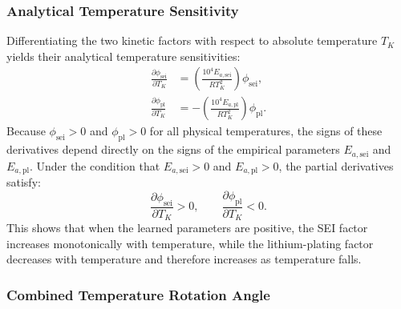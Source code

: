 \documentclass[a4paper,fleqn]{cas-sc}
\begin{document}
\subsubsection{Analytical Temperature Sensitivity}

Differentiating the two kinetic factors with respect to absolute temperature $T_K$ yields their analytical temperature sensitivities:
\begin{align}
\frac{\partial \phi_{\mathrm{sei}}}{\partial T_K} &= \left(\frac{10^4 E_{a,\mathrm{sei}}}{R T_K^2}\right)\phi_{\mathrm{sei}}, \label{eq:dphi_sei} \\
\frac{\partial \phi_{\mathrm{pl}}}{\partial T_K} &= -\left(\frac{10^4 E_{a,\mathrm{pl}}}{R T_K^2}\right)\phi_{\mathrm{pl}}. \label{eq:dphi_pl}
\end{align}
Because $\phi_{\mathrm{sei}} > 0$ and $\phi_{\mathrm{pl}} > 0$ for all physical temperatures, the signs of these derivatives depend directly on the signs of the empirical parameters $E_{a,\mathrm{sei}}$ and $E_{a,\mathrm{pl}}$. Under the condition that $E_{a,\mathrm{sei}} > 0$ and $E_{a,\mathrm{pl}} > 0$, the partial derivatives satisfy:
\begin{equation}
\frac{\partial \phi_{\mathrm{sei}}}{\partial T_K} > 0, \qquad \frac{\partial \phi_{\mathrm{pl}}}{\partial T_K} < 0.
\label{eq:signs}
\end{equation}
This shows that when the learned parameters are positive, the SEI factor increases monotonically with temperature, while the lithium-plating factor decreases with temperature and therefore increases as temperature falls.

\subsubsection{Combined Temperature Rotation Angle}
\end{document}
